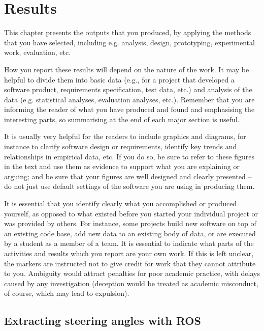 
\chapter{Results}

\label{Results} 

This chapter presents the outputs that you produced, by applying the methods that you have selected, including e.g. analysis, design, prototyping, experimental work, evaluation, etc.  
  
How you report these results will depend on the nature of the work. It may be helpful to divide them into basic data (e.g., for a project that developed a software product, requirements specification, test data, etc.) and analysis of the data (e.g. statistical analyses, evaluation analyses, etc.). Remember that you are informing the reader of what you have produced and found and emphasising the interesting parts, so summarising at the end of each major section is useful.  
  
It is usually very helpful for the readers to include graphics and diagrams, for instance to clarify software design or requirements, identify key trends and relationships in empirical data, etc. If you do so, be sure to refer to these figures in the text and use them as evidence to support what you are explaining or arguing; and be sure that your figures are well designed and clearly presented – do not just use default settings of the software you are using in producing them.  
  
It is essential that you identify clearly what you accomplished or produced yourself, as opposed to what existed before you started your individual project or was provided by others. For instance, some projects build new software on top of an existing code base, add new data to an existing body of data, or are executed by a student as a member of a team. It is essential to indicate what parts of the activities and results which you report are your own work. If this is left unclear, the markers are instructed not to give credit for work that they cannot attribute to you. Ambiguity would attract penalties for poor academic practice, with delays caused by any investigation (deception would be treated as academic misconduct, of course, which may lead to expulsion).


\section{Extracting steering angles with ROS}


